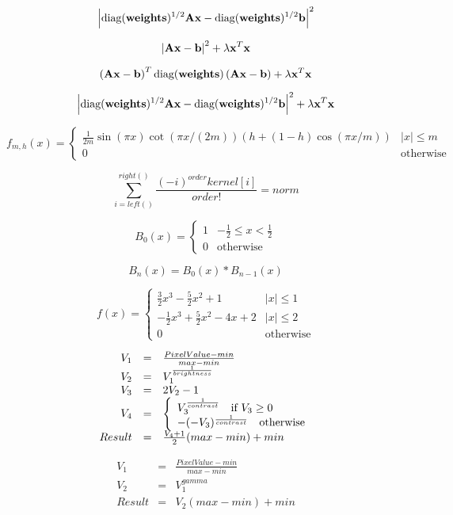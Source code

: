 \documentclass{article}
\begin{document}
\[ \left|\textrm{diag}(\textrm{\bf weights})^{1/2}\textrm{\bf A} \textrm{\bf x} - \textrm{diag}(\textrm{\bf weights})^{1/2} \textrm{\bf b}\right|^2 \]
\pagebreak

\[ \left|\textrm{\bf A} \textrm{\bf x} - \textrm{\bf b}\right|^2 + \lambda \textrm{\bf x}^T\textrm{\bf x} \]
\pagebreak

\[ \left(\textrm{\bf A} \textrm{\bf x} - \textrm{\bf b}\right)^T \textrm{diag}(\textrm{\bf weights}) \left(\textrm{\bf A} \textrm{\bf x} - \textrm{\bf b}\right) + \lambda \textrm{\bf x}^T\textrm{\bf x} \]
\pagebreak

\[ \left|\textrm{diag}(\textrm{\bf weights})^{1/2}\textrm{\bf A} \textrm{\bf x} - \textrm{diag}(\textrm{\bf weights})^{1/2} \textrm{\bf b}\right|^2 + \lambda \textrm{\bf x}^T\textrm{\bf x} \]
\pagebreak

\[ f_{m,h}(x) = \left\{ \begin{array}{ll} \frac{1}{2m}\sin(\pi x)\cot(\pi x / (2 m))(h + (1-h)\cos(\pi x/m)) & |x| \leq m \\ 0 & \mbox{otherwise} \end{array}\right. \]
\pagebreak

\[ \sum_{i=left()}^{right()} \frac{(-i)^{order}kernel[i]}{order!} = norm \]
\pagebreak

\[ B_0(x) = \left\{ \begin{array}{ll} 1 & -\frac{1}{2} \leq x < \frac{1}{2} \\ 0 & \mbox{otherwise} \end{array}\right. \]
\pagebreak

\[ B_n(x) = B_0(x) * B_{n-1}(x) \]
\pagebreak

\[ f(x) = \left\{ \begin{array}{ll} \frac{3}{2}x^3 - \frac{5}{2}x^2 + 1 & |x| \leq 1 \\ -\frac{1}{2}x^3 + \frac{5}{2}x^2 -4x + 2 & |x| \leq 2 \\ 0 & \mbox{otherwise} \end{array}\right. \]
\pagebreak

\[ \begin{array}{rcl} V_1 & = & \frac{PixelValue - min}{max - min} \\ V_2 & = & V_1^\frac{1}{brightness} \\ V_3 & = & 2 V_2 - 1 \\ V_4 & = & \left\lbrace \begin{array}{l} V_3^\frac{1}{contrast} \mbox{\rm \quad if } V_3 \ge 0 \\ - (-V_3)^\frac{1}{contrast} \mbox{\rm \quad otherwise} \end{array} \right. \\ Result & = & \frac{V_4 + 1}{2} (max - min) + min \end{array} \]
\pagebreak

\[ \begin{array}{rcl} V_1 & = & \frac{PixelValue - min}{max - min} \\ V_2 & = & V_1^{gamma} \\ Result & = & V_2 (max - min) + min \end{array} \]
\pagebreak
\end{document}
